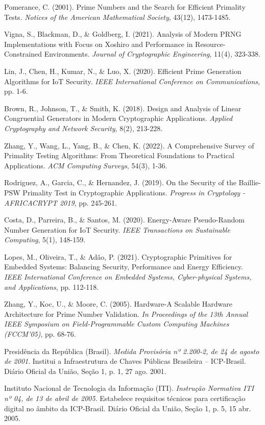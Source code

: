 \begin{thebibliography}{99}
 Pomerance, C. (2001). Prime Numbers and the Search for Efficient Primality Tests. \textit{Notices of the American Mathematical Society}, 43(12), 1473-1485.

 Vigna, S., Blackman, D., \& Goldberg, I. (2021). Analysis of Modern PRNG Implementations with Focus on Xoshiro and Performance in Resource-Constrained Environments. \textit{Journal of Cryptographic Engineering}, 11(4), 323-338.

 Lin, J., Chen, H., Kumar, N., \& Luo, X. (2020). Efficient Prime Generation Algorithms for IoT Security. \textit{IEEE International Conference on Communications}, pp. 1-6.

 Brown, R., Johnson, T., \& Smith, K. (2018). Design and Analysis of Linear Congruential Generators in Modern Cryptographic Applications. \textit{Applied Cryptography and Network Security}, 8(2), 213-228.

 Zhang, Y., Wang, L., Yang, B., \& Chen, K. (2022). A Comprehensive Survey of Primality Testing Algorithms: From Theoretical Foundations to Practical Applications. \textit{ACM Computing Surveys}, 54(3), 1-36.

 Rodriguez, A., Garcia, C., \& Hernandez, J. (2019). On the Security of the Baillie-PSW Primality Test in Cryptographic Applications. \textit{Progress in Cryptology - AFRICACRYPT 2019}, pp. 245-261.

 Costa, D., Parreira, B., \& Santos, M. (2020). Energy-Aware Pseudo-Random Number Generation for IoT Security. \textit{IEEE Transactions on Sustainable Computing}, 5(1), 148-159.

 Lopes, M., Oliveira, T., \& Adão, P. (2021). Cryptographic Primitives for Embedded Systems: Balancing Security, Performance and Energy Efficiency. \textit{IEEE International Conference on Embedded Systems, Cyber-physical Systems, and Applications}, pp. 112-118.

 Zhang, Y., Koc, U., \& Moore, C. (2005). Hardware-A Scalable Hardware Architecture for Prime Number Validation. \textit{In Proceedings of the 13th Annual IEEE Symposium on Field-Programmable Custom Computing Machines (FCCM'05)}, pp. 68-76.

Presidência da República (Brasil).
\textit{Medida Provisória nº 2.200-2, de 24 de agosto de 2001}.
Institui a Infraestrutura de Chaves Públicas Brasileira – ICP-Brasil.
Diário Oficial da União, Seção 1, p. 1, 27 ago. 2001.

Instituto Nacional de Tecnologia da Informação (ITI).
\textit{Instrução Normativa ITI nº 04, de 13 de abril de 2005}.
Estabelece requisitos técnicos para certificação digital no âmbito da ICP-Brasil.
Diário Oficial da União, Seção 1, p. 5, 15 abr. 2005.
\end{thebibliography} 